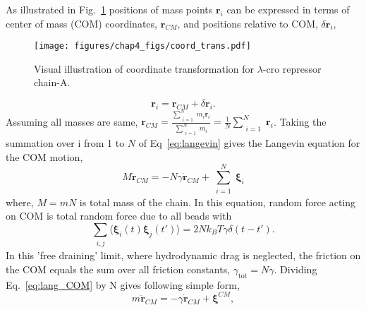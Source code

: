 \documentclass[../talant.diss.submit.tex]{subfiles}
\begin{document}
As illustrated in Fig.~\ref{fig:coord_trans} positions of mass points $\bm{r}_i$
can be expressed in terms of center of mass (COM) coordinates, $\bm{r}_{CM}$,
and positions relative to COM, $\delta \bm{r}_i$,
%
%
\begin{figure}[htp!]
  \begin{centering}
    \texttt{[image: figures/chap4\_figs/coord\_trans.pdf]}
    \caption{Visual illustration of coordinate transformation for $\lambda$-cro repressor chain-A.}
    \label{fig:coord_trans}
  \end{centering}
\end{figure}
%
%
%
%
\begin{equation}
  \label{eq:trans_coord}
  \bm{r}_i = \bm{r}_{CM} + \delta \bm{r}_i.
\end{equation}
%
%
Assuming all masses are same,
$\bm{r}_{CM} = \frac{\sum_{\substack{i=1}}^{N} m_i \bm{r}_i}{\sum_{\substack{i=1}}^{N} m_i}
= \frac{1}{N}\sum_{\substack{i=1}}^{N}\bm{r}_i$.
Taking the summation over i from 1 to $N$ of Eq~\ref{eq:langevin} gives the Langevin
equation for the COM motion,
%
%
\begin{equation}
  \label{eq:lang_COM}
  M\ddot{\bm{r}}_{CM} =
  -N\gamma\dot{\bm{r}}_{CM}
  + \sum_{\substack{i=1}}^{N}\bm{\xi}_i
\end{equation}
%
%
where, $M = mN$ is total mass of the chain. In this equation, random force acting on COM is
total random force due to all beads with
%
%
\begin{equation}
  \label{eq:corr_ij_COM}
  \sum_{\substack{i,j}} \langle \bm{\xi}_i(t) \bm{\xi}_j(t')\rangle = 2Nk_B T\gamma \delta(t-t').
\end{equation}
%
%
In this 'free draining' limit, where hydrodynamic drag is neglected,  the friction
on the COM equals the sum over all friction constants, $\gamma_\mathrm{tot} = N\gamma$. Dividing
Eq.~\ref{eq:lang_COM} by N gives following simple form,
%
%
\begin{equation}
  \label{eq:r_COM}
  m\ddot{\bm{r}}_{CM} = -\gamma\dot{\bm{r}}_{CM} + \bm{\xi}^{CM},
\end{equation}
\end{document}
